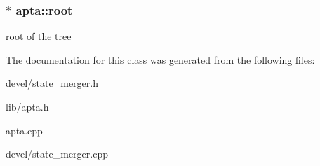\subsubsection[{\texorpdfstring{root}{root}}]{ $\ast$ apta\+::root}\hypertarget{classapta_a949591494b3e64716c9f200cc27e5828}{}\label{classapta_a949591494b3e64716c9f200cc27e5828}
root of the tree 

The documentation for this class was generated from the following files\+:\begin{DoxyCompactItemize}
\item 
devel/state\+\_\+merger.\+h\item 
lib/apta.\+h\item 
apta.\+cpp\item 
devel/state\+\_\+merger.\+cpp\end{DoxyCompactItemize}
